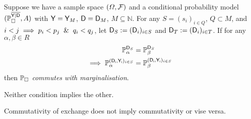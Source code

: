 \begin{definition}\label{def:caus_cont}
Suppose we have a sample space $(\Omega,\mathcal{F})$ and a conditional probability model $(\mathbb{P}_{\square}^{\overline{\mathsf{Y}|\mathsf{D}}},A)$ with $\mathsf{Y}=\mathsf{Y}_M$, $\mathsf{D}=\mathsf{D}_M$, $M\subseteq \mathbb{N}$. For any $S=(s_i)_{i\in Q}$, $Q\subset M$, and $i<j\implies p_i<p_j \And q_i<q_j$, let $\mathsf{D}_S:=(\mathsf{D}_i)_{i\in S}$ and $\mathsf{D}_T:=(\mathsf{D}_i)_{i\in T}$. If for any $\alpha,\beta\in R$
\begin{align}
    \mathbb{P}_\alpha^{\mathsf{D}_{S}}&=\mathbb{P}_\beta^{\mathsf{D}_{S}}\\
    \implies \mathbb{P}_\alpha^{(\mathsf{D_i,Y_i})_{i\in S}}&=\mathbb{P}_\beta^{(\mathsf{D_i,Y_i})_{i\in S}}
\end{align}
then $\mathbb{P}_\square$ \emph{commutes with marginalisation}.
\end{definition}

Neither condition implies the other. 
\begin{lemma}
Commutativity of exchange does not imply commutativity or vise versa.
\end{lemma}

